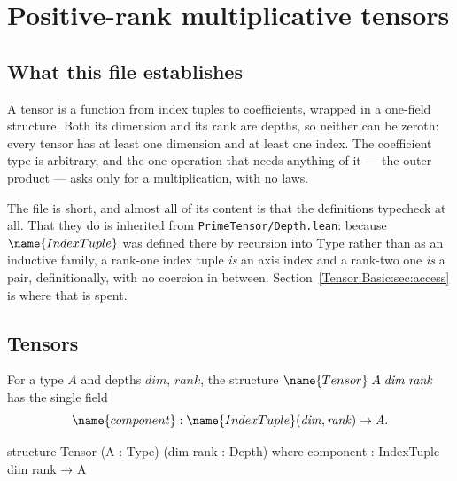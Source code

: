 
\section{Positive-rank multiplicative tensors}
\label{Tensor:Basic:sec}


\subsection*{What this file establishes}

A tensor is a function from index tuples to coefficients, wrapped in a
one-field structure.  Both its dimension and its rank are depths, so neither
can be zeroth: every tensor has at least one dimension and at least one index.
The coefficient type is arbitrary, and the one operation that needs anything
of it --- the outer product --- asks only for a multiplication, with no laws.

The file is short, and almost all of its content is that the definitions
typecheck at all.  That they do is inherited from
\texttt{PrimeTensor/Depth.lean}: because $\name{IndexTuple}$ was defined there
by recursion into $\mathrm{Type}$ rather than as an inductive family, a
rank-one index tuple \emph{is} an axis index and a rank-two one \emph{is} a
pair, definitionally, with no coercion in between.  Section~\ref{Tensor:Basic:sec:access}
is where that is spent.

\subsection{Tensors}

\begin{definition}\label{Tensor:Basic:def:tensor}
For a type $A$ and depths $\mathit{dim}$, $\mathit{rank}$, the structure
$\name{Tensor}\;A\;\mathit{dim}\;\mathit{rank}$ has the single field
\[
  \name{component} :
    \name{IndexTuple}(\mathit{dim}, \mathit{rank}) \to A.
\]
\end{definition}

\begin{leancode}
structure Tensor (A : Type) (dim rank : Depth) where
  component : IndexTuple dim rank → A
\end{leancode}

